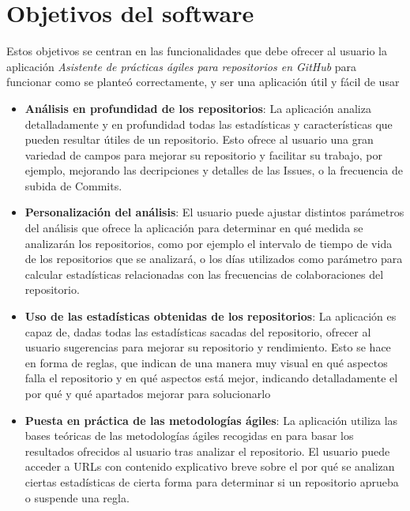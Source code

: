  \label{sec:objetivos}


\section{Objetivos del software}

Estos objetivos se centran en las funcionalidades que debe ofrecer al usuario la aplicación \textit{Asistente de prácticas ágiles para repositorios en GitHub} para funcionar como se planteó correctamente, y ser una aplicación útil y fácil de usar

\begin{itemize}
    \item \textbf{Análisis en profundidad de los repositorios}: La aplicación analiza detalladamente y en profundidad todas las estadísticas y características que pueden resultar útiles de un repositorio. Esto ofrece al usuario una gran variedad de campos para mejorar su repositorio y facilitar su trabajo, por ejemplo, mejorando las decripciones y detalles de las Issues, o la frecuencia de subida de Commits.

    \item \textbf{Personalización del análisis}: El usuario puede ajustar distintos parámetros del análisis que ofrece la aplicación para determinar en qué medida se analizarán los repositorios, como por ejemplo el intervalo de tiempo de vida de los repositorios que se analizará, o los días utilizados como parámetro para calcular estadísticas relacionadas con las frecuencias de colaboraciones del repositorio.
    
    \item \textbf{Uso de las estadísticas obtenidas de los repositorios}: La aplicación es capaz de, dadas todas las estadísticas sacadas del repositorio, ofrecer al usuario sugerencias para mejorar su repositorio y rendimiento. Esto se hace en forma de reglas, que indican de una manera muy visual en qué aspectos falla el repositorio y en qué aspectos está mejor, indicando detalladamente el por qué y qué apartados mejorar para solucionarlo
    
    \item \textbf{Puesta en práctica de las metodologías ágiles}: La aplicación utiliza las bases teóricas de las metodologías ágiles recogidas en \cite{agileSubwayMap} para basar los resultados ofrecidos al usuario tras analizar el repositorio. El usuario puede acceder a URLs con contenido explicativo breve sobre el por qué se analizan ciertas estadísticas de cierta forma para determinar si un repositorio aprueba o suspende una regla.
    

\end{itemize}

